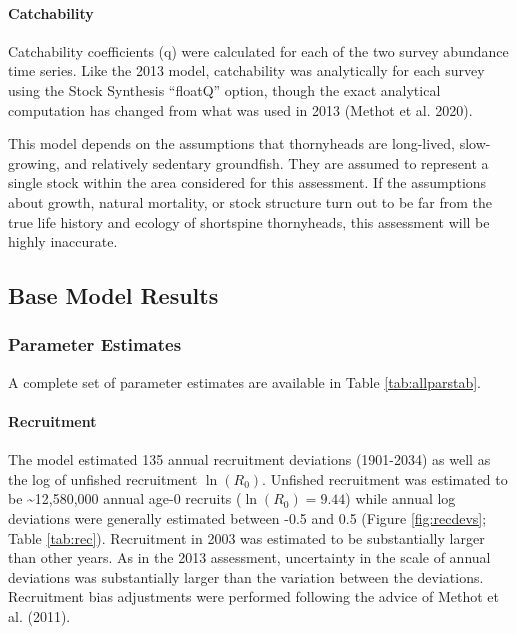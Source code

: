\documentclass[11pt,
  english,
  letterpaper,
]{article}
\begin{document}
\hypertarget{catchability}{%
\paragraph{Catchability}\label{catchability}}

Catchability coefficients (q) were calculated for each of the two survey abundance time series. Like the 2013 model, catchability was analytically for each survey using the Stock Synthesis ``floatQ'' option, though the exact analytical computation has changed from what was used in 2013 (Methot et al. 2020).

This model depends on the assumptions that thornyheads are long-lived, slow-growing, and relatively sedentary groundfish. They are assumed to represent a single stock within the area considered for this assessment. If the assumptions about growth, natural mortality, or stock structure turn out to be far from the true life history and ecology of shortspine thornyheads, this assessment will be highly inaccurate.

\hypertarget{base-model-results}{%
\subsection{Base Model Results}\label{base-model-results}}

\hypertarget{parameter-estimates}{%
\subsubsection{Parameter Estimates}\label{parameter-estimates}}

A complete set of parameter estimates are available in Table \ref{tab:allparstab}.

\hypertarget{recruitment-1}{%
\paragraph{Recruitment}\label{recruitment-1}}

The model estimated 135 annual recruitment deviations (1901-2034) as well as the log of unfished recruitment \(\ln(R_0)\). Unfished recruitment was estimated to be \textasciitilde12,580,000 annual age-0 recruits (\(\ln(R_0) = 9.44\)) while annual log deviations were generally estimated between -0.5 and 0.5 (Figure \ref{fig:recdevs}; Table \ref{tab:rec}). Recruitment in 2003 was estimated to be substantially larger than other years. As in the 2013 assessment, uncertainty in the scale of annual deviations was substantially larger than the variation between the deviations. Recruitment bias adjustments were performed following the advice of Methot et al. (2011).
\end{document}
